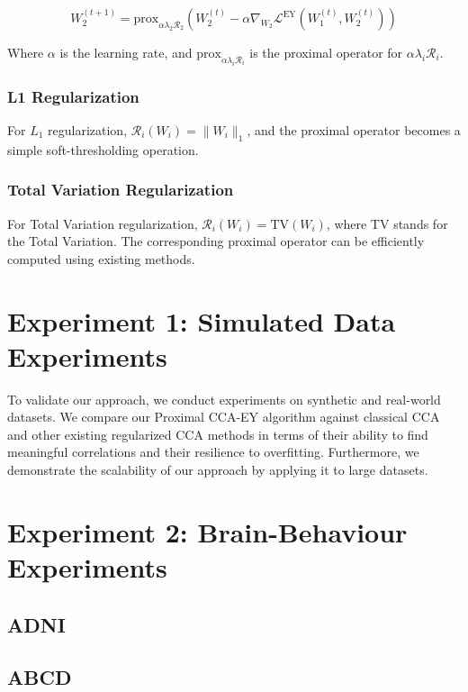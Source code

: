 \begin{equation}
\label{eq:proximal-update-W2}
    W_2^{(t+1)} = \text{prox}_{\alpha \lambda_2 \mathcal{R}_2}\left( W_2^{(t)} - \alpha \nabla_{W_2} \mathcal{L}^{\text{EY}}(W_1^{(t)}, W_2^{(t)}) \right)
\end{equation}

Where \( \alpha \) is the learning rate, and \( \text{prox}_{\alpha \lambda_i \mathcal{R}_i} \) is the proximal operator for \( \alpha \lambda_i \mathcal{R}_i \).

\subsubsection{L1 Regularization}
For \( L_1 \) regularization, \( \mathcal{R}_i(W_i) = \| W_i \|_1 \), and the proximal operator becomes a simple soft-thresholding operation.

\subsubsection{Total Variation Regularization}
For Total Variation regularization, \( \mathcal{R}_i(W_i) = \text{TV}(W_i) \), where TV stands for the Total Variation.
The corresponding proximal operator can be efficiently computed using existing methods.


\section{Experiment 1: Simulated Data Experiments}
To validate our approach, we conduct experiments on synthetic and real-world datasets.
We compare our Proximal CCA-EY algorithm against classical CCA and other existing regularized CCA methods in terms of their ability to find meaningful correlations and their resilience to overfitting.
Furthermore, we demonstrate the scalability of our approach by applying it to large datasets.

\section{Experiment 2: Brain-Behaviour Experiments}


\subsection{ADNI}


\subsection{ABCD}


